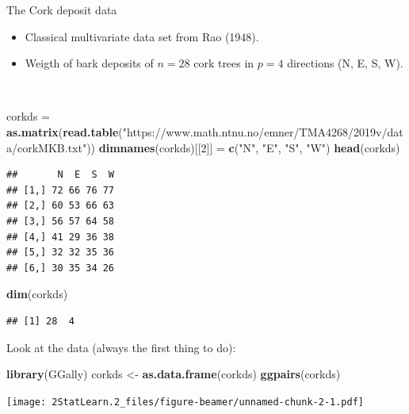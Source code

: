 \documentclass[
  ignorenonframetext,
]{beamer}
\newenvironment{Shaded}{\begin{snugshade}}{\end{snugshade}}
\newcommand{\DecValTok}[1]{\textcolor[rgb]{0.00,0.00,0.81}{#1}}
\newcommand{\FunctionTok}[1]{\textcolor[rgb]{0.13,0.29,0.53}{\textbf{#1}}}
\newcommand{\NormalTok}[1]{#1}
\newcommand{\OtherTok}[1]{\textcolor[rgb]{0.56,0.35,0.01}{#1}}
\newcommand{\StringTok}[1]{\textcolor[rgb]{0.31,0.60,0.02}{#1}}
\providecommand{\tightlist}{%
  \setlength{\itemsep}{0pt}\setlength{\parskip}{0pt}}
\begin{document}
\begin{frame}[fragile]
\begin{block}{The Cork deposit data}
\protect\hypertarget{the-cork-deposit-data}{}
\(~\)

\begin{itemize}
\tightlist
\item
  Classical multivariate data set from Rao (1948).
\item
  Weigth of bark deposits of \(n=28\) cork trees in \(p=4\) directions
  (N, E, S, W).
\end{itemize}

\(~\)

\tiny

\begin{Shaded}
\begin{Highlighting}[]
\NormalTok{corkds }\OtherTok{=} \FunctionTok{as.matrix}\NormalTok{(}\FunctionTok{read.table}\NormalTok{(}\StringTok{"https://www.math.ntnu.no/emner/TMA4268/2019v/data/corkMKB.txt"}\NormalTok{))}
\FunctionTok{dimnames}\NormalTok{(corkds)[[}\DecValTok{2}\NormalTok{]] }\OtherTok{=} \FunctionTok{c}\NormalTok{(}\StringTok{"N"}\NormalTok{, }\StringTok{"E"}\NormalTok{, }\StringTok{"S"}\NormalTok{, }\StringTok{"W"}\NormalTok{)}
\FunctionTok{head}\NormalTok{(corkds)}
\end{Highlighting}
\end{Shaded}

\begin{verbatim}
##       N  E  S  W
## [1,] 72 66 76 77
## [2,] 60 53 66 63
## [3,] 56 57 64 58
## [4,] 41 29 36 38
## [5,] 32 32 35 36
## [6,] 30 35 34 26
\end{verbatim}

\begin{Shaded}
\begin{Highlighting}[]
\FunctionTok{dim}\NormalTok{(corkds)}
\end{Highlighting}
\end{Shaded}

\begin{verbatim}
## [1] 28  4
\end{verbatim}
\end{block}
\end{frame}

\begin{frame}[fragile]
Look at the data (always the first thing to do):

\tiny

\begin{Shaded}
\begin{Highlighting}[]
\FunctionTok{library}\NormalTok{(GGally)}
\NormalTok{corkds }\OtherTok{\textless{}{-}} \FunctionTok{as.data.frame}\NormalTok{(corkds)}
\FunctionTok{ggpairs}\NormalTok{(corkds)}
\end{Highlighting}
\end{Shaded}

\texttt{[image: 2StatLearn.2\_files/figure-beamer/unnamed-chunk-2-1.pdf]}
\end{frame}
\end{document}
